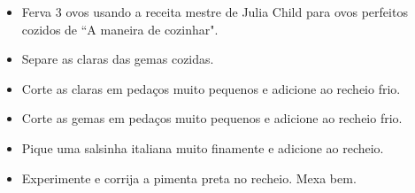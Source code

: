 \documentclass [11pt, letterpaper] {article}
\newcommand \fileName {ChickenFilling}
\begin{document}
\begin {description}
\begin{enumerate}
\begin{itemize}
	\item Ferva 3 ovos usando a receita mestre de Julia Child para ovos perfeitos cozidos de ``A maneira de cozinhar".
        \item Separe as claras das gemas cozidas.
        \item Corte as claras em peda\c{c}os muito pequenos e adicione ao recheio frio.
        \item Corte as gemas  em peda\c{c}os muito pequenos e adicione ao recheio frio.
        \item Pique uma salsinha italiana muito finamente e adicione ao recheio.
        \item Experimente e corrija a pimenta preta no recheio. Mexa bem.
         \end {itemize}
\end {enumerate}
\end {description}


\end{document}
